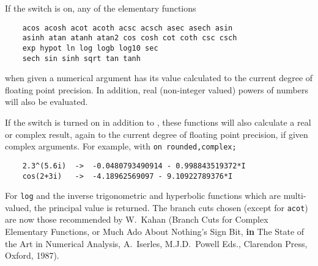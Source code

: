 If the switch  is on, any of the
elementary functions
\begin{verbatim}
    acos acosh acot acoth acsc acsch asec asech asin
    asinh atan atanh atan2 cos cosh cot coth csc csch
    exp hypot ln log logb log10 sec
    sech sin sinh sqrt tan tanh
\end{verbatim}
when given a numerical argument has its value calculated to the current
degree of floating point precision.  In addition, real (non-integer
valued) powers of numbers will also be evaluated.

If the  switch is turned on in addition to ,
these functions will also calculate a real or complex result, again to
the current degree of floating point precision,
if given complex arguments.  For example, with \texttt{on rounded,complex;}
\begin{verbatim}
    2.3^(5.6i)  ->  -0.0480793490914 - 0.998843519372*I
    cos(2+3i)   ->  -4.18962569097 - 9.10922789376*I
\end{verbatim}

For \texttt{log} and the inverse trigonometric and hyperbolic functions which are
multi-valued, the principal value is returned. The branch cuts chosen
(except for \texttt{acot}) are now
those recommended by W.~Kahan (Branch Cuts for Complex Elementary Functions,
or Much Ado About Nothing's Sign Bit,
\textbf{in} The State of the Art in Numerical Analysis,
A.~Iserles, M.J.D.~Powell Eds., Clarendon Press, Oxford, 1987).

